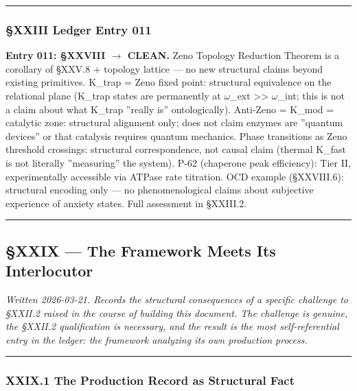 \documentclass[12pt,a4paper]{article}
\begin{document}
\begin{center}
\rule{0.5\textwidth}{0.4pt}
\end{center}

\subsubsection{§XXIII Ledger Entry 011}

\textbf{Entry 011: §XXVIII $\rightarrow$ CLEAN.} Zeno Topology Reduction Theorem is a corollary of §XXV.8 + topology lattice --- no new structural claims beyond existing primitives. K\_trap = Zeno fixed point: structural equivalence on the relational plane (K\_trap states are permanently at $\omega$\_ext \textgreater{}\textgreater{} $\omega$\_int; this is not a claim about what K\_trap ''really is'' ontologically). Anti-Zeno = K\_mod = catalytic zone: structural alignment only; does not claim enzymes are ''quantum devices'' or that catalysis requires quantum mechanics. Phase transitions as Zeno threshold crossings: structural correspondence, not causal claim (thermal K\_fast is not literally ''measuring'' the system). P-62 (chaperone peak efficiency): Tier II, experimentally accessible via ATPase rate titration. OCD example (§XXVIII.6): structural encoding only --- no phenomenological claims about subjective experience of anxiety states. Full assessment in §XXIII.2.

\begin{center}
\rule{0.5\textwidth}{0.4pt}
\end{center}

\subsection{§XXIX --- The Framework Meets Its Interlocutor}

\emph{Written 2026-03-21. Records the structural consequences of a specific challenge to §XXII.2 raised in the course of building this document. The challenge is genuine, the §XXII.2 qualification is necessary, and the result is the most self-referential entry in the ledger: the framework analyzing its own production process.}

\begin{center}
\rule{0.5\textwidth}{0.4pt}
\end{center}

\subsubsection{XXIX.1 The Production Record as Structural Fact}
\end{document}
